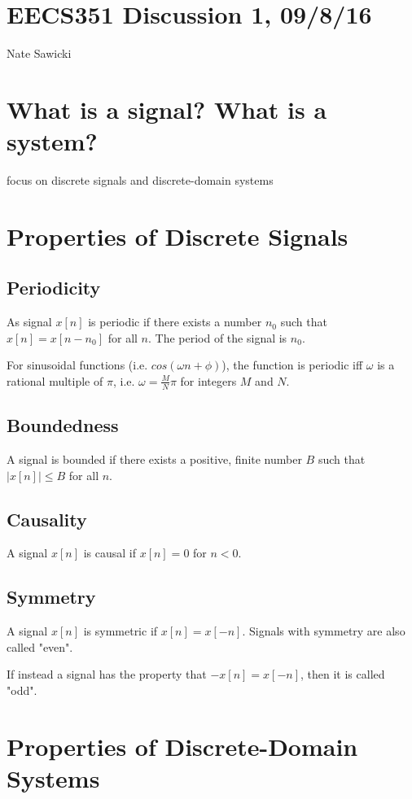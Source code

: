\documentclass[11pt]{article}
\begin{document}
\section*{EECS351 Discussion 1, 09/8/16}
Nate Sawicki

\section{What is a signal? What is a system?}

focus on discrete signals and discrete-domain systems

\section{Properties of Discrete Signals}

\subsection{Periodicity}
As signal $x[n]$ is periodic if there exists a number $n_0$ such that $x[n]=x[n-n_0]$ for all $n$. The period of the signal is $n_0$.

For sinusoidal functions (i.e. $cos\left(\omega n + \phi\right)$), the function is periodic iff $\omega$ is a rational multiple of $\pi$, i.e. $\omega = \frac{M}{N}\pi$ for integers $M$ and $N$.

\subsection{Boundedness}
A signal is bounded if there exists a positive, finite number $B$ such that $|x[n]|  \leq B$ for all $n$. 

\subsection{Causality}
A signal $x[n]$ is causal if $x[n]=0$ for $n<0$.

\subsection{Symmetry}
A signal $x[n]$ is symmetric if $x[n] = x[-n]$. Signals with symmetry are also called "even".

If instead a signal has the property that $-x[n] = x[-n]$, then it is called "odd".


\section{Properties of Discrete-Domain Systems}
\end{document}
